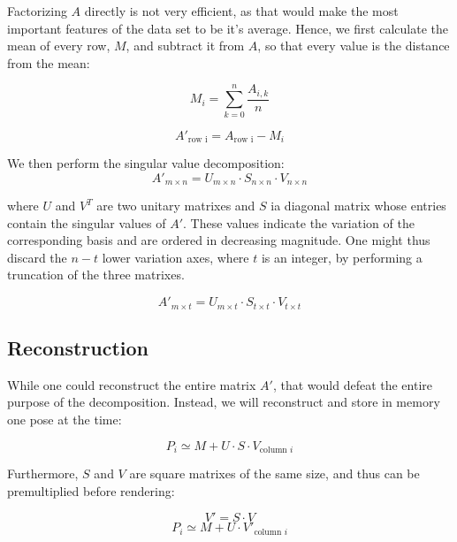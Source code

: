 \documentclass[annual]{acmsiggraph}
\begin{document}
Factorizing $A$ directly is not very efficient, as that would make the most important features of the data set to be it's average. Hence, we first calculate the mean of every row, $M$, and subtract it from $A$, so that every value is the distance from the mean:

\begin{equation}
	M_{i} = \sum _{k = 0} ^{n} \frac {A_{i,k}} {n}
\end{equation}

\begin{equation}
	A'_{\text{row i}} = A_{\text{row i}} - M_{i}
\end{equation}

We then perform the singular value decomposition:
\begin{equation}
	A'_{m \times n} = U_{m \times n} \cdot S_{n \times n} \cdot V _{n \times n}
\end{equation}

where $U$ and $V^{T}$ are two unitary matrixes and $S$ ia diagonal matrix whose entries contain the singular values of $A'$. These values indicate the variation of the corresponding basis and are ordered in decreasing magnitude. One might thus discard the $n - t$ lower variation axes, where $t$ is an integer, by performing a truncation of the three matrixes.

\begin{equation}
	A'_{m \times t} = U_{m \times t} \cdot S_{t \times t} \cdot V _{t \times t}
\end{equation}

\subsection{Reconstruction}

While one could reconstruct the entire matrix $A'$, that would defeat the entire purpose of the decomposition. Instead, we will reconstruct and store in memory one pose at the time:

\begin{equation}
	P_{i} \simeq M + U \cdot S \cdot V_{\text{column } i}
\end{equation}

Furthermore, $S$ and $V$ are square matrixes of the same size, and thus can be premultiplied before rendering:

\begin{equation}
	V' = S \cdot V
\end{equation}
\begin{equation}
	P_{i} \simeq M + U \cdot V'_{\text{column } i}
\end{equation}
\end{document}
